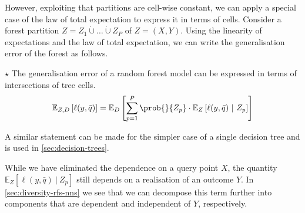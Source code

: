 \documentclass[../main.tex]{subfiles}
\begin{document}
However, exploiting that partitions are cell-wise constant, we can apply a special case of the law of total expectation to express it in terms of cells.
Consider a forest partition $Z = Z_{1} \dot\cup \dots \dot\cup Z_{P}$ of $Z=(X,Y)$. Using the linearity of expectations and the law of total expectation, we can write the generalisation error of the forest as follows. 
\begin{proposition} 
   \label{thm:random-forest-structure} 
    $\star$ The generalisation error of a random forest model can be expressed in terms of intersections of tree cells.
$$
\mathbb{E}_{Z,D}\left[ \ell(y,\bar{q}) \right] = \mathbb{E}_{D}\left[ \sum_{p=1}^P \prob{}{Z_{p}} \cdot \mathbb{E}_{Z}\left[ \ell(y, \bar{q}) ~|~Z_{p}\right]   \right] 
$$
\end{proposition} 
A similar statement can be made for the simpler case of a single decision tree and is used in \cref{sec:decision-trees}.

While we have eliminated the dependence on a query point $X$, the quantity $\mathbb{E}_{Z}\left[ \ell(y, \bar{q}) ~|~Z_{p}\right]$ still depends on a realisation of an outcome $Y$. In \cref{sec:diversity-rfs-nns} we see that we can decompose this term further into components that are dependent and independent of $Y$, respectively.
\end{document}
